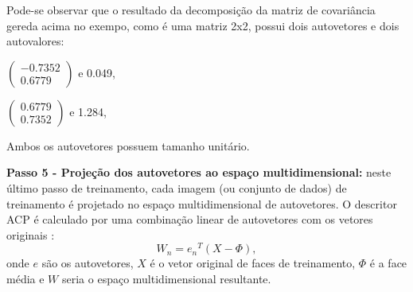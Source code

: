 Pode-se observar que o resultado da decomposição da matriz de covariância gereda acima no exempo, como é uma matriz 2x2, possui dois autovetores e dois autovalores:
\begin{center}
	$\begin{pmatrix} -0.7352 \\ 0.6779 \end{pmatrix}$  e 0.049,
	
	$\begin{pmatrix} 0.6779 \\ 0.7352 \end{pmatrix}$  e 1.284,
\end{center}
Ambos os autovetores possuem tamanho unitário.


\textbf{Passo 5 - Projeção dos autovetores ao espaço multidimensional:}  neste último passo de treinamento, cada imagem (ou conjunto de dados) de treinamento é projetado no espaço multidimensional de autovetores. O descritor ACP é calculado por uma combinação linear de autovetores com os vetores originais \cite{geysilva}:
\begin{equation}
	W_n = {e_n}^T (X - \Phi),
\end{equation}
onde $e$ são os autovetores, $X$ é o vetor original de faces de treinamento, $\Phi$ é a face média e $W$ seria o espaço multidimensional resultante.








